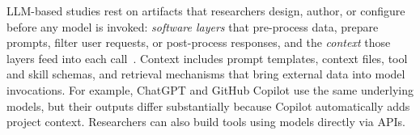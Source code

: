 
LLM-based studies rest on artifacts that researchers design, author, or configure before any model is invoked: \emph{software layers} that pre-process data, prepare prompts, filter user requests, or post-process responses, and the \emph{context} those layers feed into each call~\cite{galster2026configuring}. Context includes prompt templates, context files, tool and skill schemas, and retrieval mechanisms that bring external data into model invocations.
For example, ChatGPT and GitHub Copilot use the same underlying models, but their outputs differ substantially because Copilot automatically adds project context. Researchers can also build tools using models directly via APIs.

